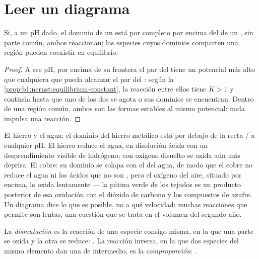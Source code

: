 \section{Leer un diagrama}\label{sec:b1:e-ph-diagrams:reading}

\begin{proposition}\label{prop:b1:e-ph-diagrams:disjoint-domains}
Si, a un pH dado, el dominio de un  está por completo por encima
del de un , sin parte común, ambos reaccionan; las especies cuyos
dominios comparten una región pueden coexistir en equilibrio.
\end{proposition}

\begin{proof}
A ese pH, por encima de su frontera el par del  tiene un
potencial más alto que cualquiera que pueda alcanzar el par del :
según la \cref{prop:b1:nernst:equilibrium-constant}, la reacción entre
ellos tiene
$K > 1$ y continúa hasta que uno de los dos se agota o sus dominios se
encuentran. Dentro de una región común, ambos son las formas estables al
mismo potencial: nada impulsa una reacción.
\end{proof}

El hierro y el agua: el dominio del hierro metálico está por debajo de la
recta / a cualquier pH. El hierro reduce el agua, en
disolución ácida con un desprendimiento visible de hidrógeno; con oxígeno
disuelto se oxida aún más deprisa. El cobre: su dominio se solapa con el
del agua, de modo que el cobre no reduce el agua ni los ácidos que no son
, pero el oxígeno del aire, situado por encima, lo oxida
lentamente --- la pátina verde de los tejados es un producto posterior de
esa oxidación con el dióxido de carbono y los compuestos de azufre. Un
diagrama dice lo que es posible, no a qué velocidad: muchas reacciones
que permite son lentas, una cuestión que se trata en el volumen del
segundo año.

\begin{definition}\label{def:b1:e-ph-diagrams:disproportionation}
La \emph{dismutación} es la reacción de una especie
consigo misma, en la que una parte se oxida y la otra se reduce:
. La reacción inversa, en la que dos especies del
mismo elemento dan una de  intermedio, es la
\emph{comproporción}:
.
\end{definition}

